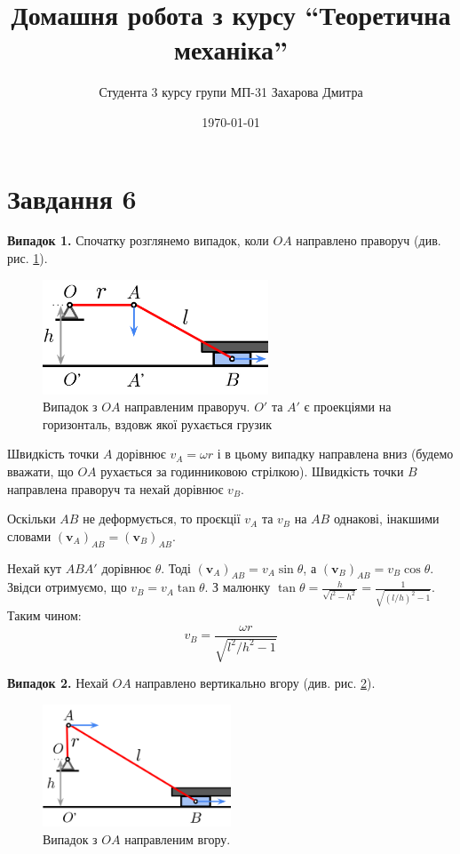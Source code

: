 \documentclass[12pt]{extarticle}
\title{Домашня робота з курсу ``Теоретична механіка''}
\author{Студента 3 курсу групи МП-31 Захарова Дмитра}
\date{\today}
\begin{document}
\maketitle

\section*{Завдання 6}

\textbf{Випадок 1.} Спочатку розглянемо випадок, коли $OA$ направлено праворуч (див. рис. \ref{fig:1}).

\begin{figure}[H]
    \centering
    \includegraphics[width=0.6\textwidth]{images/hw_3/hw_3_1.png}
    \caption{Випадок з $OA$ направленим праворуч. $O'$ та $A'$ є проекціями на горизонталь, вздовж якої рухається грузик}
    \label{fig:1}
\end{figure}
\vspace{5px}

Швидкість точки $A$ дорівнює $v_A=\omega r$ і в цьому випадку направлена вниз (будемо вважати, що $OA$ рухається за годинниковою стрілкою). Швидкість точки $B$ направлена праворуч та нехай дорівнює $v_B$. 

Оскільки $AB$ не деформується, то проєкції $v_A$ та $v_B$ на $AB$ однакові, інакшими словами $(\boldsymbol{v}_A)_{AB} = (\boldsymbol{v}_B)_{AB}$.

Нехай кут $ABA'$ дорівнює $\theta$. Тоді $(\boldsymbol{v}_A)_{AB} = v_A \sin \theta$, а $(\boldsymbol{v}_B)_{AB} = v_B \cos \theta$. Звідси отримуємо, що $v_B = v_A \tan \theta$. З малюнку $\tan\theta = \frac{h}{\sqrt{l^2-h^2}} = \frac{1}{\sqrt{(l/h)^2-1}}$. Таким чином:
\[
v_B = \frac{\omega r}{\sqrt{l^2/h^2-1}}
\]

\textbf{Випадок 2.} Нехай $OA$ направлено вертикально вгору (див. рис. \ref{fig:2}).

\begin{figure}[H]
    \centering
    \includegraphics[width=0.5\textwidth]{images/hw_3/hw_3_2.png}
    \caption{Випадок з $OA$ направленим вгору.}
    \label{fig:2}
\end{figure}
\vspace{5px}
\end{document}
